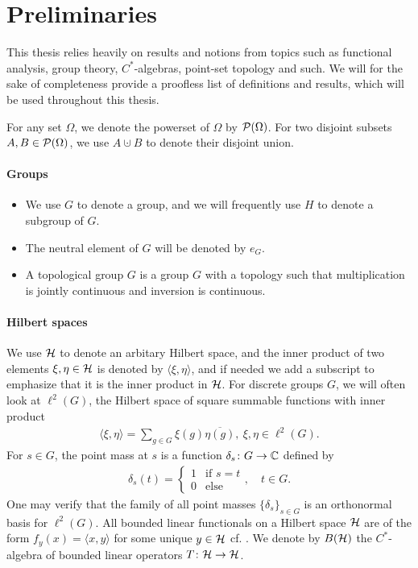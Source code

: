 \chapter*{Preliminaries}
This thesis relies heavily on results and notions from topics such as functional analysis, group theory, $C^*$-algebras, point-set topology and such. We will for the sake of completeness provide a proofless list of definitions and results, which will be used throughout this thesis. 

For any set $\Omega$, we denote the powerset of $\Omega$ by $\mathcal{P}(\Omega)$. For two disjoint subsets $A,B \in \mathcal{P}(\Omega)$, we use $A \cupdot B$ to denote their disjoint union.
\subsubsection*{Groups}
\begin{itemize}
\item We use $G$ to denote a group, and we will frequently use $H$ to denote a subgroup of $G$.
\item The neutral element of $G$ will be denoted by $e_G$.
\item A topological group $G$ is a group $G$ with a topology such that multiplication is jointly continuous and inversion is continuous.
\end{itemize}

\subsubsection*{Hilbert spaces}
We use $\mathcal{H}$ to denote an arbitary Hilbert space, and the inner product of two elements $\xi, \eta \in \mathcal{H}$ is denoted by $\langle \xi , \eta \rangle$, and if needed we add a subscript to emphasize that it is the inner product in $\mathcal{H}$. For discrete groups $G$, we will often look at $\ell^2(G)$, the Hilbert space of square summable functions with inner product 
\begin{align*}
\langle \xi,\eta \rangle = \sum_{g \in G} \xi(g) \overline{\eta(g)}, \ \xi,\eta \in \ell^2(G).
\end{align*}  For $s \in G$, the point mass at $s$ is a function $\delta_s \colon G \to \mathbb{C}$ defined by
\begin{align*}
\delta_s(t)=\begin{cases}
1 & \text{if }s=t\\
0 & \text{else}
\end{cases}, \quad t \in G.
\end{align*}
One may verify that the family of all point masses $\{ \delta_s\}_{s \in G}$ is an orthonormal basis for $\ell^2(G)$. All bounded linear functionals on a Hilbert space $ \mathcal{H}$ are of the form $f_y(x)=\langle x,y\rangle$ for some unique $y \in \mathcal{H}$ cf. \cite[5.25][174]{folland2013real}. We denote by $B(\mathcal{H})$ the $C^*$-algebra of bounded linear operators $T \colon \mathcal{H} \to \mathcal{H}$.

